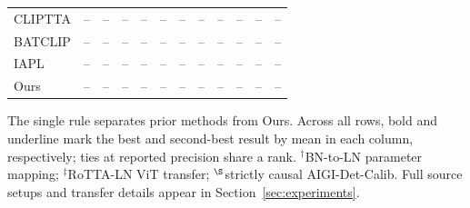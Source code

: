 \begin{table}[t]
{\begin{tabular}{lccccccccccc}
CLIPTTA & -- & -- & -- & -- & -- & -- & -- & -- & -- & -- & -- \\
BATCLIP & -- & -- & -- & -- & -- & -- & -- & -- & -- & -- & -- \\
IAPL & -- & -- & -- & -- & -- & -- & -- & -- & -- & -- & -- \\
\midrule
Ours & -- & -- & -- & -- & -- & -- & -- & -- & -- & -- & -- \\
\bottomrule
\end{tabular}%
}
\vspace{2pt}
\parbox{\textwidth}{\footnotesize The single rule separates prior methods from Ours. Across all rows, bold and underline mark the best and second-best result by mean in each column, respectively; ties at reported precision share a rank. $^{\dagger}$BN-to-LN parameter mapping; $^{\ddagger}$RoTTA-LN ViT transfer; $^{\S}$strictly causal AIGI-Det-Calib. Full source setups and transfer details appear in Section~\ref{sec:experiments}.}
\end{table}
